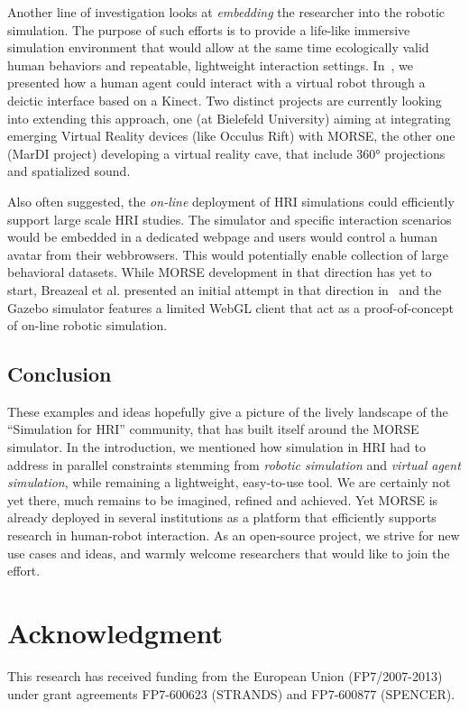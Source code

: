 \documentclass{llncs}
\begin{document}
Another line of investigation looks at \emph{embedding} the researcher into the
robotic simulation. The purpose of such efforts is to provide a life-like
immersive simulation environment that would allow at the same time ecologically
valid human behaviors and repeatable, lightweight interaction settings.
In~\cite{lemaignan2012morse}, we presented how a human agent could interact with
a virtual robot through a deictic interface based on a Kinect. Two distinct
projects are currently looking into extending this approach, one (at Bielefeld
University) aiming at integrating emerging Virtual Reality devices (like Occulus
Rift) with MORSE, the other one (MarDI project) developing a virtual reality
cave, that include 360° projections and spatialized sound.

Also often suggested, the \emph{on-line} deployment of HRI simulations could
efficiently support large scale HRI studies. The simulator and specific
interaction scenarios would be embedded in a dedicated webpage and users would
control a human avatar from their webbrowsers. This would potentially enable
collection of large behavioral datasets. While MORSE development in that
direction has yet to start, Breazeal et al. presented an initial attempt in that
direction in~\cite{breazeal2013crowdsourcing} and the Gazebo simulator features
a limited WebGL client that act as a proof-of-concept of on-line robotic
simulation.


\subsection*{Conclusion}

These examples and ideas hopefully give a picture of the lively landscape of the
``Simulation for HRI'' community, that has built itself around the MORSE
simulator.  In the introduction, we mentioned how simulation in HRI had to
address in parallel constraints stemming from \emph{robotic simulation} and
\emph{virtual agent simulation}, while remaining a lightweight, easy-to-use
tool. We are certainly not yet there, much remains to be imagined, refined and
achieved.  Yet MORSE is already deployed in several institutions as a platform
that efficiently supports research in human-robot interaction. As an open-source
project, we strive for new use cases and ideas, and warmly welcome researchers
that would like to join the effort.


\section*{Acknowledgment}

This research has received funding from the European
Union (FP7/2007-2013) under grant agreements
FP7-600623 (STRANDS) and FP7-600877 (SPENCER).



\end{document}
